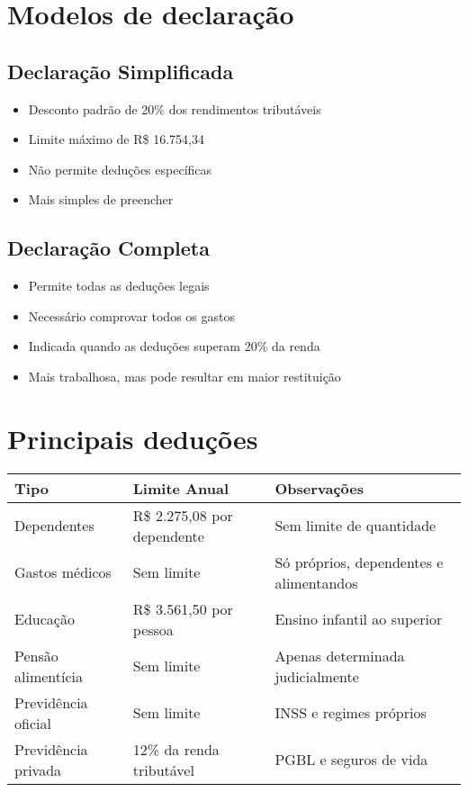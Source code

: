 \documentclass[12pt,a4paper]{article}
\begin{document}
\section{Modelos de declaração}

\subsection{Declaração Simplificada}
\begin{itemize}
    \item Desconto padrão de 20\% dos rendimentos tributáveis
    \item Limite máximo de R\$ 16.754,34
    \item Não permite deduções específicas
    \item Mais simples de preencher
\end{itemize}

\subsection{Declaração Completa}
\begin{itemize}
    \item Permite todas as deduções legais
    \item Necessário comprovar todos os gastos
    \item Indicada quando as deduções superam 20\% da renda
    \item Mais trabalhosa, mas pode resultar em maior restituição
\end{itemize}

\section{Principais deduções}

\begin{longtable}{|p{4cm}|p{4cm}|p{6cm}|}
\hline
\textbf{Tipo} & \textbf{Limite Anual} & \textbf{Observações} \\
\hline
Dependentes & R\$ 2.275,08 por dependente & Sem limite de quantidade \\
\hline
Gastos médicos & Sem limite & Só próprios, dependentes e alimentandos \\
\hline
Educação & R\$ 3.561,50 por pessoa & Ensino infantil ao superior \\
\hline
Pensão alimentícia & Sem limite & Apenas determinada judicialmente \\
\hline
Previdência oficial & Sem limite & INSS e regimes próprios \\
\hline
Previdência privada & 12\% da renda tributável & PGBL e seguros de vida \\
\hline
\end{longtable}
\end{document}
